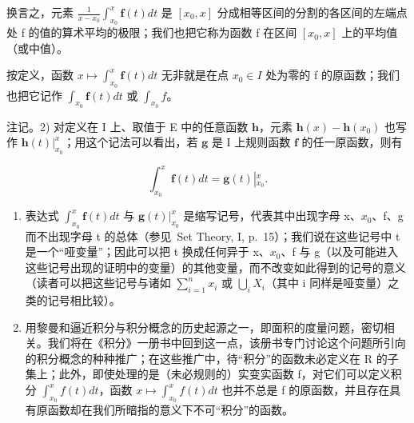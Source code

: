 换言之，元素 \(\frac{1}{x-x_{0}}\int_{x_{0}}^{x}\mathbf{f}(t)dt\) 是 \([x_{0},x]\) 分成相等区间的分割的各区间的左端点处 f 的值的算术平均的极限；我们也把它称为函数 f 在区间 \([x_{0},x]\) 上的平均值（或中值）。

按定义，函数 \(x \mapsto \int_{x_{0}}^{x} \mathbf{f}(t) dt\) 无非就是在点 \(x_{0} \in I\) 处为零的 f 的原函数；我们也把它记作 \(\int_{x_{0}} \mathbf{f}(t) dt\) 或 \(\int_{x_{0}} f\)。

注记。2) 对定义在 I 上、取值于 E 中的任意函数 \(\mathbf{h}\)，元素 \(\mathbf{h}(x) - \mathbf{h}(x_0)\) 也写作 \(\left.\mathbf{h}(t)\right|_{x_0}^x\)；用这个记法可以看出，若 \(\mathbf{g}\) 是 I 上规则函数 \(\mathbf{f}\) 的任一原函数，则有

\[
\int_ {x _ {0}} ^ {x} \mathbf {f} (t) d t = \mathbf {g} (t) \left| _ {x _ {0}} ^ {x}. \right.\tag{3}
\]

\begin{enumerate}
\def\labelenumi{\arabic{enumi})}
\setcounter{enumi}{2}
\item
  表达式 \(\int_{x_{0}}^{x}\mathbf{f}(t)dt\) 与 \(\mathbf{g}(t)\bigg|_{x_{0}}^{x}\) 是缩写记号，代表其中出现字母 x、\(x_{0}\)、f、g 而不出现字母 t 的总体（参见~Set Theory, I, p.~15）；我们说在这些记号中 t 是一个“哑变量”；因此可以把 t 换成任何异于 x、\(x_{0}\)、f 与 g（以及可能进入这些记号出现的证明中的变量）的其他变量，而不改变如此得到的记号的意义（读者可以把这些记号与诸如 \(\sum_{i=1}^{n}x_{i}\) 或 \(\bigcup_{i}X_{i}\)（其中 i 同样是哑变量）之类的记号相比较）。
\item
  用黎曼和逼近积分与积分概念的历史起源之一，即面积的度量问题，密切相关。我们将在《积分》一册书中回到这一点，该册书专门讨论这个问题所引向的积分概念的种种推广；在这些推广中，待“积分”的函数未必定义在 R 的子集上；此外，即使处理的是（未必规则的）实变实函数 f，对它们可以定义积分 \(\int_{x_{0}}^{x}f(t)dt\)，函数 \(x\mapsto\int_{x_{0}}^{x}f(t)dt\) 也并不总是 f 的原函数，并且存在具有原函数却在我们所暗指的意义下不可“积分”的函数。
\end{enumerate}
\relax{}
